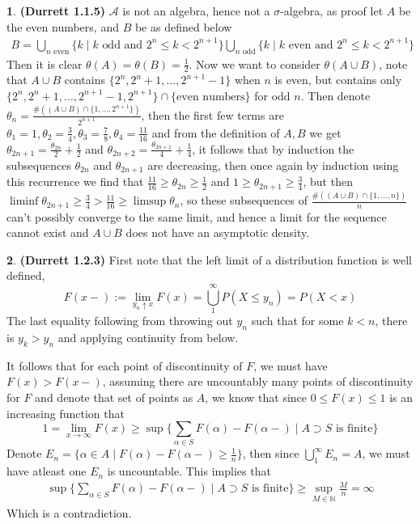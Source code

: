 \documentclass[10.5pt]{article}
\theoremstyle{definition}
\newtheorem{pb}{}
\newcommand{\set}[1]{\{#1\}}
\begin{document}
    \begin{pb}\textbf{(Durrett 1.1.5)}
        \(\mathcal{A}\) is not an algebra, hence not a \(\sigma\)-algebra, as proof let \(A\) be the even numbers, and \(B\) be as defined below
        \begin{align*}
            B = \bigcup_{n \text{ even}} \set{k \mid k \text{ odd and } 2^n \leq k < 2^{n+1}} \bigcup_{n \text{ odd}}\set{k \mid k \text{ even and }2^n \leq k < 2^{n+1}}
        \end{align*}
        Then it is clear \(\theta(A) = \theta(B) = \frac12\). Now we want to consider \(\theta(A \cup B)\), note that \(A \cup B\) contains \(\set{2^n, 2^n+1,\hdots,2^{n+1}-1}\) when \(n\) is even, but contains only \(\set{2^n, 2^n+1,\hdots,2^{n+1}-1,2^{n+1}} \cap \set{\text{even numbers}}\) for odd \(n\). Then denote \(\theta_n = \frac{\#((A \cup B) \cap \set{1,\hdots,2^{n+1}})}{2^{n+1}}\), then the first few terms are \(\theta_1 = 1, \theta_2 = \frac{3}{4}, \theta_3 = \frac{7}{8}, \theta_4 = \frac{11}{16}\) and from the definition of \(A,B\) we get \(\theta_{2n+1} = \frac{\theta_{2n}}{2} + \frac12\) and \(\theta_{2n+2} = \frac{\theta_{2n+1}}{4} + \frac{1}{4}\), it follows that by induction the subsequences \(\theta_{2n}\) and \(\theta_{2n+1}\) are decreasing, then once again by induction using this recurrence we find that \(\frac{11}{16} \geq \theta_{2n} \geq \frac12\) and \(1 \geq \theta_{2n+1} \geq \frac34\), but then \(\liminf \theta_{2n+1} \geq \frac34 > \frac{11}{16} \geq \limsup \theta_n\), so these subsequences of \(\frac{\#((A \cup B) \cap \set{1,\hdots,n})}{n}\) can't possibly converge to the same limit, and hence a limit for the sequence cannot exist and \(A \cup B\) does not have an asymptotic density.
    \end{pb}
    \begin{pb}\textbf{(Durrett 1.2.3)} First note that the left limit of a distribution function is well defined,
        \[F(x-) := \lim_{y_n\uparrow x}F(x) = \bigcup_1^\infty P(X \leq y_n) = P(X < x)\]
        The last equality following from throwing out \(y_n\) such that for some \(k<n\), there is \(y_k > y_n\) and applying continuity from below.
        
        It follows that for each point of discontinuity of \(F\), we must have \(F(x) > F(x-)\), assuming there are uncountably many points of discontinuity for \(F\) and denote that set of points as \(A\), we know that since \(0 \leq F(x) \leq 1\) is an increasing function that \[1=\lim_{x\to\infty}F(x) \geq \sup\set{\sum_{\alpha \in S}F(\alpha) - F(\alpha-) \mid A \supset S \text{ is finite}}\]
        Denote \(E_n = \set{\alpha \in A \mid F(\alpha) - F(\alpha-) \geq \frac{1}{n}}\), then since \(\bigcup_1^\infty E_n = A\), we must have atleast one \(E_n\) is uncountable. This implies that 
        \begin{align*}
            \sup\set{\sum_{\alpha \in S}F(\alpha) - F(\alpha-) \mid A \supset S \text{ is finite}} \geq \sup_{M \in \mathbb{N}}\frac{M}{n}= \infty
        \end{align*}
        Which is a contradiction.
    \end{pb}
\end{document}
